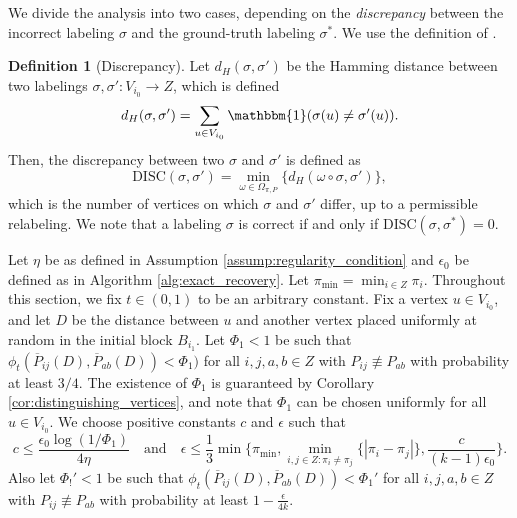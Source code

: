 \documentclass{article}
\newcommand{\1}{\mathbbm{1}}
\theoremstyle{definition}
\newtheorem{definition}{Definition}
\theoremstyle{plain}
\begin{document}
We divide the analysis into two cases, depending on the \textit{discrepancy} between the incorrect labeling $\sigma$ and the ground-truth labeling $\sigma^*$. We use the definition of  \cite{Gaudio+2025}.
\begin{definition}[Discrepancy]
    Let $d_H(\sigma, \sigma')$ be the Hamming distance between two labelings $\sigma, \sigma' : V_{i_0} \to Z$, which is defined
    \begin{equation*}
        d_H(\sigma, \sigma') = \sum_{u \in V_{i_0}} \1(\sigma(u) \neq \sigma'(u)).
    \end{equation*}
    Then, the discrepancy between two $\sigma$ and $\sigma'$ is defined as
    \begin{equation*}
        \text{DISC}(\sigma, \sigma') = \min_{\omega \in \Omega_{\pi, P}} \{d_H(\omega \circ \sigma, \sigma')\},
    \end{equation*}
    which is the number of vertices on which $\sigma$ and $\sigma'$ differ, up to a permissible relabeling. We note that a labeling $\sigma$ is correct if and only if $\text{DISC}(\sigma, \sigma^*) = 0$.
\end{definition}

Let $\eta$ be as defined in Assumption \ref{assump:regularity_condition} and $\epsilon_0$ be defined as in Algorithm \ref{alg:exact_recovery}. Let $\pi_\text{min} = \min_{i \in Z} \pi_i$. Throughout this section, we fix $t \in (0,1)$ to be an arbitrary constant. Fix a vertex $u \in V_{i_0}$, and let $D$ be the distance between $u$ and another vertex placed uniformly at random in the initial block $B_{i_1}$. Let $\Phi_1 < 1$ be such that $\phi_t(\overline{P}_{ij}(D), \overline{P}_{ab}(D)) < \Phi_1)$ for all $i,j,a,b \in Z$ with $P_{ij} \not \equiv P_{ab}$ with probability at least $3/4$. The existence of $\Phi_1$ is guaranteed by Corollary \ref{cor:distinguishing_vertices}, and note that $\Phi_1$ can be chosen uniformly for all $u \in V_{i_0}$. We choose positive constants $c$ and $\epsilon$ such that
\begin{equation}
\label{eq:def_c_epsilon}
    c \leq \frac{\epsilon_0 \log(1/\Phi_1)}{4 \eta} \quad \text{and} \quad \epsilon \leq \frac{1}{3}\min\bigg\{\pi_\text{min}, \min_{i,j \in Z: \pi_i \neq \pi_j} \{|\pi_i - \pi_j|\}, \frac{c}{(k-1)\epsilon_0}\bigg\}.
\end{equation}
Also let $\Phi_!' < 1$ be such that $\phi_t(\overline{P}_{ij}(D), \overline{P}_{ab}(D)) < \Phi_1'$ for all $i,j,a,b \in Z$ with $P_{ij} \not \equiv P_{ab}$ with probability at least $1 - \frac{\epsilon}{4k}$.
\end{document}
